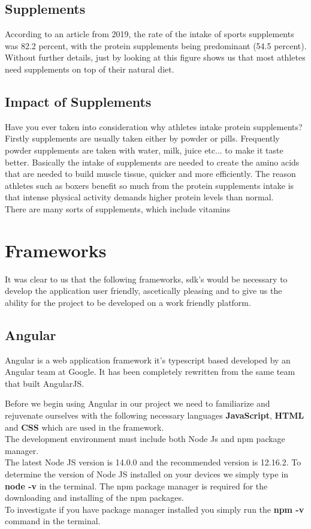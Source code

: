 \documentclass[a4paper,12pt,twoside]{report}
\begin{document}
\subsection{Supplements}
According to an article from 2019, the rate of the intake of sports supplements was 82.2 percent, with the protein supplements being predominant (54.5 percent). Without further details, just by looking at this figure shows us that most athletes need supplements on top of their natural diet.
\cite{Supplements}
\subsection{Impact of Supplements}
Have you ever taken into consideration why athletes intake protein supplements?\\ Firstly supplements are usually taken either by powder or pills. Frequently powder supplements are taken with water, milk, juice etc... to make it taste better. Basically the intake of supplements are needed to create the amino acids that are needed to build muscle tissue, quicker and more efficiently. The reason athletes such as boxers benefit so much from the protein supplements intake is that intense physical activity demands higher protein levels than normal.
\\
There are many sorts of supplements, which include vitamins 

\section{Frameworks}

It was clear to us that the following frameworks, sdk's would be necessary to develop the application user friendly, ascetically pleasing and to give us the ability for the project to be developed on a work friendly platform.

\subsection{Angular}

Angular is a web application framework it's typescript based developed by an Angular team at Google.
It has been completely rewritten from the same team that built AngularJS.

Before we begin using Angular in our project we need to familiarize and rejuvenate ourselves with the following necessary languages \textbf{JavaScript}, \textbf{HTML} and \textbf{CSS} which are used in the framework.\\
The development environment must include both Node Js and npm package manager.\\
The latest Node JS version is 14.0.0 and the recommended version is 12.16.2. To determine the version of Node JS installed on your devices we simply type in \textbf{node -v} in the terminal.
The npm package manager is required for the downloading and installing of the npm packages.
\\To investigate if you have package manager installed you simply run the \textbf{npm -v} command in the terminal.\cite{angularSetup}
\end{document}
